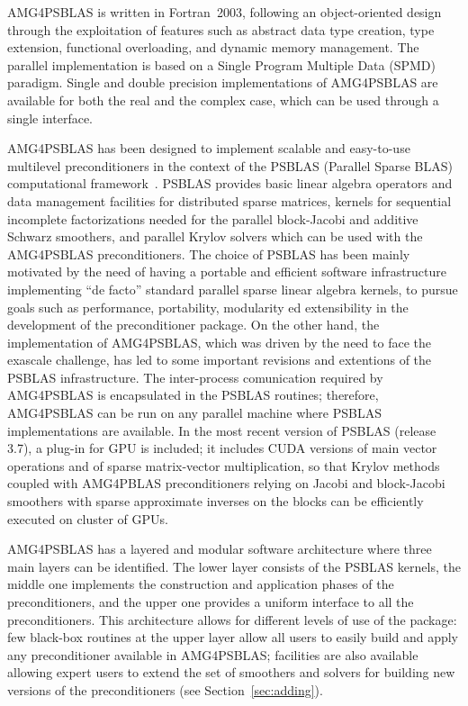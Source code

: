 AMG4PSBLAS is written in Fortran~2003, following an
object-oriented design through the exploitation of features
such as abstract data type creation, type extension, functional overloading, and
dynamic memory management.
The parallel implementation is based on a Single Program Multiple Data
(SPMD) paradigm.  Single and
double precision implementations of AMG4PSBLAS are available for both the
real and the complex case, which can be used through a single
interface.

AMG4PSBLAS has been designed to implement scalable and easy-to-use
multilevel preconditioners in the context of the PSBLAS (Parallel Sparse BLAS)
computational framework~\cite{psblas_00,PSBLAS3}. PSBLAS provides basic linear algebra
operators and data management facilities for distributed sparse matrices,
kernels for sequential incomplete factorizations needed for the parallel block-Jacobi and additive Schwarz smoothers, and
parallel Krylov solvers which can be used with the AMG4PSBLAS preconditioners.
The choice of PSBLAS has been mainly motivated by the need of having
a portable and efficient software infrastructure implementing ``de facto'' standard
parallel sparse linear algebra kernels, to pursue goals such as performance,
portability, modularity ed extensibility in the development of the preconditioner
package. On the other hand, the implementation of AMG4PSBLAS, which was driven by the need to face the exascale challenge, has led to some important  revisions and extentions of the PSBLAS infrastructure.
The inter-process comunication required by AMG4PSBLAS is encapsulated
in the PSBLAS routines;
therefore, AMG4PSBLAS can be run on any parallel machine where PSBLAS
implementations are available. In the most recent version of PSBLAS (release 3.7), a plug-in for GPU is included; it includes CUDA versions of
main vector operations and of sparse matrix-vector multiplication, so that Krylov methods coupled with AMG4PBLAS preconditioners 
relying on Jacobi and block-Jacobi smoothers with sparse approximate inverses on the blocks can be efficiently executed on cluster of GPUs.

AMG4PSBLAS has a layered and modular software architecture where three main layers can be
identified.  The lower layer consists of the PSBLAS kernels, the middle one implements
the construction and application phases of the preconditioners, and the upper one
provides a uniform interface to all the preconditioners.
This architecture allows for different levels of use of the package:
few black-box routines at the upper layer allow all users to easily
build and apply any preconditioner available in AMG4PSBLAS;
facilities are also available allowing expert users to extend the set of smoothers
and solvers for building new versions of the preconditioners (see
Section~\ref{sec:adding}).

